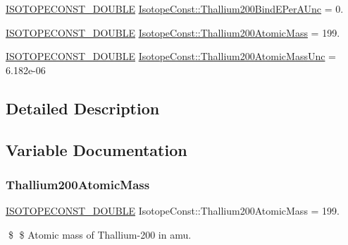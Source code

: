 \begin{DoxyCompactItemize}
\mbox{\hyperlink{group___isotope_const-_macros_ga8f45a7272ce02c0b4c65c44636ed719a}{I\+S\+O\+T\+O\+P\+E\+C\+O\+N\+S\+T\+\_\+\+D\+O\+U\+B\+LE}} \mbox{\hyperlink{group___isotope_const-_thallium-_tl200_gaa230e30e0db97584bb91baa51ecf6114}{Isotope\+Const\+::\+Thallium200\+Bind\+E\+Per\+A\+Unc}} = 0.
\item 
\mbox{\hyperlink{group___isotope_const-_macros_ga8f45a7272ce02c0b4c65c44636ed719a}{I\+S\+O\+T\+O\+P\+E\+C\+O\+N\+S\+T\+\_\+\+D\+O\+U\+B\+LE}} \mbox{\hyperlink{group___isotope_const-_thallium-_tl200_gaa38cf1a556cadf263483f6cf79c2b2d5}{Isotope\+Const\+::\+Thallium200\+Atomic\+Mass}} = 199.
\item 
\mbox{\hyperlink{group___isotope_const-_macros_ga8f45a7272ce02c0b4c65c44636ed719a}{I\+S\+O\+T\+O\+P\+E\+C\+O\+N\+S\+T\+\_\+\+D\+O\+U\+B\+LE}} \mbox{\hyperlink{group___isotope_const-_thallium-_tl200_gaed1619bb4bce302adcbd08a805b59211}{Isotope\+Const\+::\+Thallium200\+Atomic\+Mass\+Unc}} = 6.\+182e-\/06
\end{DoxyCompactItemize}


\subsection{Detailed Description}


\subsection{Variable Documentation}
\mbox{\label{group___isotope_const-_thallium-_tl200_gaa38cf1a556cadf263483f6cf79c2b2d5}} 
\subsubsection{\texorpdfstring{Thallium200\+Atomic\+Mass}{Thallium200AtomicMass}}
{\footnotesize\ttfamily \mbox{\hyperlink{group___isotope_const-_macros_ga8f45a7272ce02c0b4c65c44636ed719a}{I\+S\+O\+T\+O\+P\+E\+C\+O\+N\+S\+T\+\_\+\+D\+O\+U\+B\+LE}} Isotope\+Const\+::\+Thallium200\+Atomic\+Mass = 199.}

\$ \$ Atomic mass of Thallium-\/200 in amu. \mbox{\label{group___isotope_const-_thallium-_tl200_gaed1619bb4bce302adcbd08a805b59211}} 

